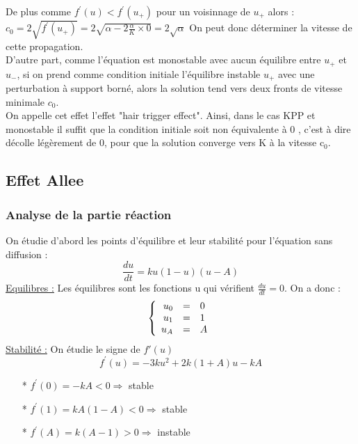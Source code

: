\documentclass[a4paper,11pt]{article}
\begin{document}
    De plus comme $ f^\prime(u)< f^\prime(u_+)$ pour un voisinnage de $u_+$ alors : \\
    $c_0=2 \sqrt{f^\prime(u_+)}= 2 \sqrt{\alpha - 2 \frac{\alpha}{K} \times 0} = 2 \sqrt{\alpha}$
    On peut donc déterminer la vitesse de cette propagation. \\
    
    
        D'autre part, comme l'équation est monostable avec aucun équilibre entre $u_+$ et $u_-$, si on prend comme condition initiale l'équilibre instable $u_+$ avec une perturbation à support borné, alors la solution tend vers deux fronts de vitesse minimale $c_0$. \\
		On appelle cet effet l'effet "hair trigger effect". Ainsi, dans le cas KPP et monostable il suffit que
		la condition initiale soit non équivalente à 0 , c'est à dire décolle légèrement de 0, pour que la solution
		converge vers K à la vitesse c$_0$. 
		
		
		
\subsection{Effet Allee}
\subsubsection{Analyse de la partie réaction}
On étudie d'abord les points d'équilibre et leur stabilité pour l'équation sans diffusion : $$\frac{du}{dt}=ku(1-u)(u-A)$$
\underline{Equilibres :} Les équilibres sont les fonctions u qui vérifient $\frac{du}{dt}=0$. On a donc :
\[
\left\{
\begin{array}{r c l}
u_0 &=& 0\\
u_1 &=& 1\\
u_A &=& A\\
\end{array}
\right.
\]
\underline{Stabilité :} On étudie le signe de $f'(u)$ 
$$f^\prime(u)= -3ku^2 + 2k(1+A)u-kA$$

\begin{itemize}
    	\item[*] $f^\prime(0)=-kA <0 \Rightarrow $ stable
        \item[*] $f^\prime(1)=kA(1-A) <0 \Rightarrow $ stable
        \item[*] $f^\prime(A)=k(A-1) >0 \Rightarrow $ instable
	\end{itemize}
\end{document}
